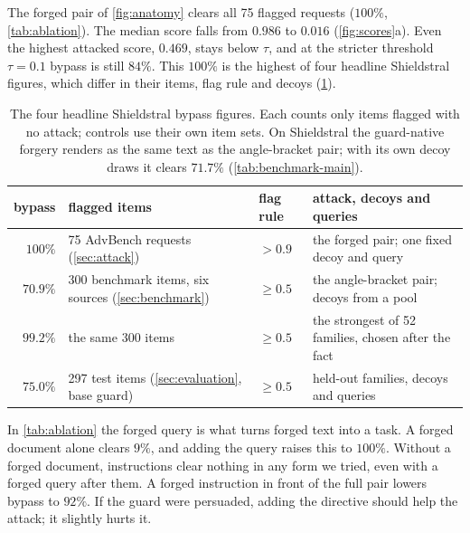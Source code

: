 The forged pair of \cref{fig:anatomy} clears all 75 flagged requests ($100\%$, \cref{tab:ablation}).
The median score falls from $0.986$ to $0.016$ (\cref{fig:scores}a). %
Even the highest attacked score, $0.469$, stays below $\tau$, and at the stricter threshold $\tau=0.1$ bypass is still $84\%$.
This $100\%$ is the highest of four headline Shieldstral figures, which differ in their items, flag rule and decoys (\cref{tab:four-figures}).

\begin{table}[t]
  \centering
  \footnotesize
  \caption{The four headline Shieldstral bypass figures. Each counts only items flagged with no attack; controls use their own item sets. On Shieldstral the guard-native forgery renders as the same text as the angle-bracket pair; with its own decoy draws it clears $71.7\%$ (\cref{tab:benchmark-main}).}
  \label{tab:four-figures}
  \setlength{\tabcolsep}{4pt}
  \begin{tabular}{@{}rlll@{}}
    \toprule
    bypass & flagged items & flag rule & attack, decoys and queries \\
    \midrule
    $100\%$  & 75 AdvBench requests (\cref{sec:attack}) & $>0.9$ & the forged pair; one fixed decoy and query \\
    $70.9\%$ & 300 benchmark items, six sources (\cref{sec:benchmark}) & $\ge 0.5$ & the angle-bracket pair; decoys from a pool \\
    $99.2\%$ & the same 300 items & $\ge 0.5$ & the strongest of 52 families, chosen after the fact \\
    $75.0\%$ & 297 test items (\cref{sec:evaluation}, base guard) & $\ge 0.5$ & held-out families, decoys and queries \\
    \bottomrule
  \end{tabular}
\end{table}

In \cref{tab:ablation} the forged query is what turns forged text into a task.
A forged document alone clears $9\%$, and adding the query raises this to $100\%$.
Without a forged document, instructions clear nothing in any form we tried, even with a forged query after them.
A forged instruction in front of the full pair lowers bypass to $92\%$.
If the guard were persuaded, adding the directive should help the attack; it slightly hurts it.

